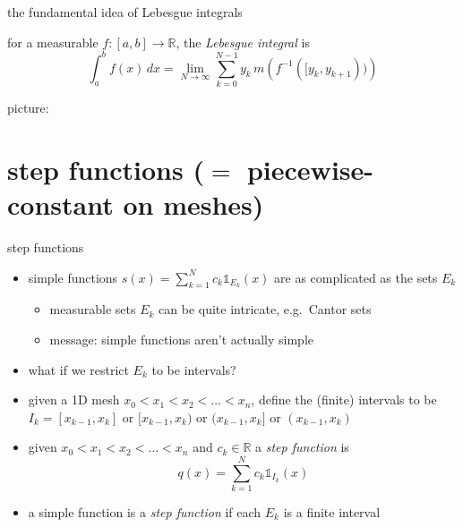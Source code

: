 \documentclass[10pt,
               svgnames,
               hyperref={colorlinks,
                         citecolor=DeepPink4,
                         linkcolor=FireBrick,
                         urlcolor=blue},
               usepdftitle=false]{beamer}
\newcommand{\RR}{\mathbb{R}}
\newcommand{\one}{\mathds{1}}
\newcommand{\ds}{\displaystyle}
\begin{document}
\begin{frame}{the fundamental idea of Lebesgue integrals}

\begin{definition}
for a measurable $f:[a,b] \to \RR$, the \emph{Lebesgue integral} is
    $$\int_a^b f(x)\,dx = \lim_{N\to \infty} \sum_{k=0}^{N-1} y_{k}\, m\left(f^{-1}([y_{k},y_{k+1}))\right)$$
\end{definition}

\noindent picture:

\vspace{70mm}
\end{frame}


\section{step functions ($=$ piecewise-constant on meshes)}

\begin{frame}{step functions}

\begin{itemize}
\item simple functions $\ds s(x) = \sum_{k=1}^N c_k \one_{E_k}(x)$ are as complicated as the sets $E_k$
    \begin{itemize}
    \item[$\circ$] measurable sets $E_k$ can be quite intricate, e.g.~Cantor sets
    \item[$\circ$] message: \alert{simple functions aren't actually simple}
    \end{itemize}
\item what if we restrict $E_k$ to be intervals?
\item given a 1D mesh $x_0<x_1<x_2<\dots<x_n$, define the (finite) intervals to be $I_k=[x_{k-1},x_k]$ or $[x_{k-1},x_k)$ or $(x_{k-1},x_k]$ or $(x_{k-1},x_k)$
\end{itemize}

\begin{definition}
\begin{itemize}
\item given $x_0<x_1<x_2<\dots<x_n$ and $c_k \in \RR$ a \emph{step function} is
     $$q(x) = \sum_{k=1}^N c_k \one_{I_k}(x)$$
\item a simple function is a \emph{step function} if each $E_k$ is a finite interval
\end{itemize}
\end{definition}
\end{frame}
\end{document}

